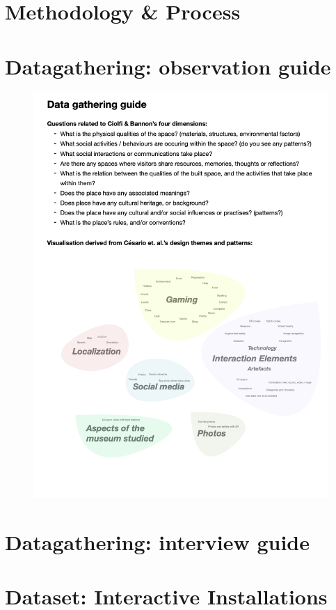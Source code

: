 \section{Methodology & Process}


\section{Datagathering: observation guide}
\begin{figure}[H]
\includegraphics[width=13cm]{pictures/appendix/datagathering.png}
\centering 
\end{figure}

\section{Datagathering: interview guide}
\section{Dataset: Interactive Installations}

